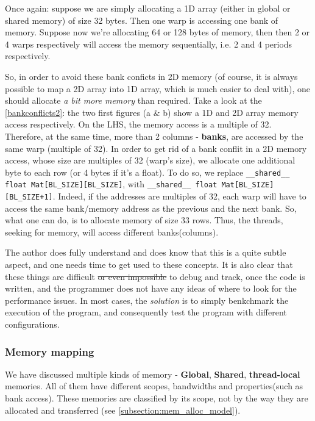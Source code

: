 {Once again: suppose we are simply allocating a 1D array (either in global or shared memory) of size 32 bytes. Then one warp is accessing one bank of memory. 
Suppose now we're allocating 64 or 128 bytes of memory, then then 2 or 4 warps respectively will access the memory sequentially, i.e. 2 and 4 periods respectively.

So, in order to avoid these bank conficts in 2D memory (of course, it is always possible to map a 2D array into 1D array, which is much easier to deal with), one should allocate 
\textit{a bit more memory} than required. Take a look at the \autoref{bankconflicts2}: the two first figures (a \& b) show a 1D and 2D array memory access respectively. 
On the LHS, the memory access is a multiple of 32. Therefore, at the same time, more than 2 columns - \textbf{banks}, are accessed by the same warp (multiple of 32). 
In order to get rid of a bank conflit in a 2D memory access, whose size are multiples of 32 (warp's size), we allocate one additional byte to each row (or 4 bytes if it's a float).
To do so, we replace \verb|__shared__ float Mat[BL_SIZE][BL_SIZE]|, with \verb|__shared__ float Mat[BL_SIZE][BL_SIZE+1]|. Indeed, if the addresses are multiples of 32, each warp will 
have to access the same bank/memory address as the previous and the next bank. So, what one can do, is to allocate memory of size 33 rows. Thus, the threads, seeking for memory, will 
access different banks(columns).

The author does fully understand and does know that this is a quite subtle aspect, and one needs time to get used 
to these concepts. It is also clear that these things are difficult \sout{or even impossible} to debug and track, once the code is written, and the programmer 
does not have any ideas of where to look for the performance issues. In most cases, 
the \textit{solution} is to simply benkchmark the execution of the program, and consequently test the program with different configurations. 



\subsubsection{Memory mapping}
We have discussed multiple kinds of memory - \textbf{Global}, \textbf{Shared}, 
\textbf{thread-local} memories. All of them have different scopes, 
bandwidths and properties(such as bank access). These memories are classified by its scope, 
not by the way they are allocated and transferred (see \ref{subsection:mem_alloc_model}).

}
